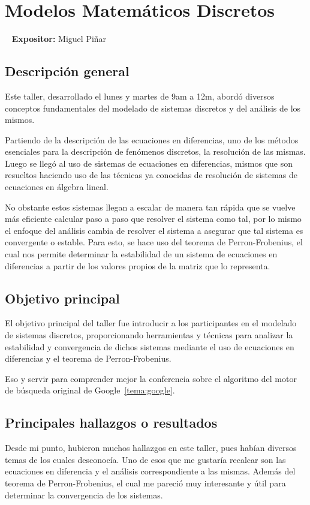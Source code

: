 \documentclass[11pt]{article}
\begin{document}
    \portada{}
    \newpage

    \section{Modelos Matemáticos Discretos}~\label{tema:ecu_en_diff}
    \textbf{Expositor:} Miguel Piñar

    \subsection{Descripción general}
    Este taller, desarrollado el lunes y martes de 9am a 12m, abordó diversos conceptos fundamentales del modelado de sistemas discretos y del análisis de los mismos. 

    Partiendo de la descripción de las ecuaciones en diferencias, uno de los métodos esenciales para la descripción de fenómenos discretos, la resolución de las mismas. Luego se llegó al uso de sistemas de ecuaciones en diferencias, mismos que son resueltos haciendo uso de las técnicas ya conocidas de resolución de sistemas de ecuaciones en álgebra lineal. 
    
    No obstante estos sistemas llegan a escalar de manera tan rápida que se vuelve más eficiente calcular paso a paso que resolver el sistema como tal, por lo mismo el enfoque del análisis cambia de resolver el sistema a asegurar que tal sistema es convergente o estable. Para esto, se hace uso del teorema de Perron-Frobenius, el cual nos permite determinar la estabilidad de un sistema de ecuaciones en diferencias a partir de los valores propios de la matriz que lo representa.

    \subsection{Objetivo principal}
    El objetivo principal del taller fue introducir a los participantes en el modelado de sistemas discretos, proporcionando herramientas y técnicas para analizar la estabilidad y convergencia de dichos sistemas mediante el uso de ecuaciones en diferencias y el teorema de Perron-Frobenius.

    Eso y servir para comprender mejor la conferencia sobre el algoritmo del motor de búsqueda original de Google~\ref{tema:google}.

    \subsection{Principales hallazgos o resultados}
    Desde mi punto, hubieron muchos hallazgos en este taller, pues habían diversos temas de los cuales desconocía. Uno de esos que me gustaría recalcar son las ecuaciones en diferencia y el análisis correspondiente a las mismas. Además del teorema de Perron-Frobenius, el cual me pareció muy interesante y útil para determinar la convergencia de los sistemas.
\end{document}
